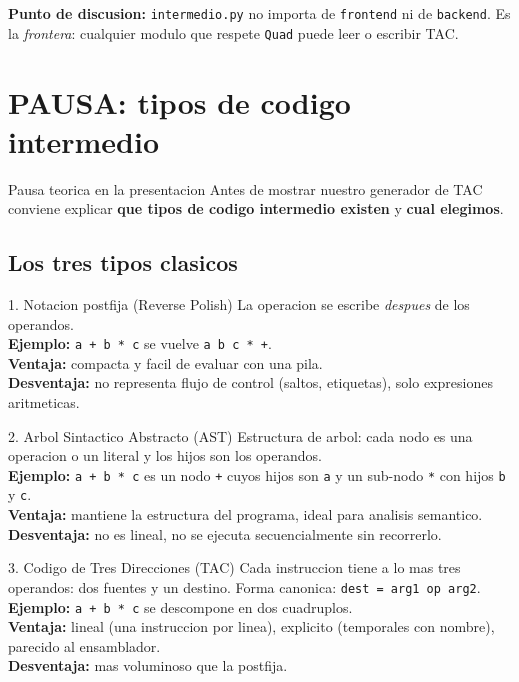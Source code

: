 \documentclass[11pt,a4paper]{article}
\begin{document}
\textbf{Punto de discusion:} \texttt{intermedio.py} no importa de
\texttt{frontend} ni de \texttt{backend}. Es la \emph{frontera}: cualquier
modulo que respete \texttt{Quad} puede leer o escribir TAC.

\section{PAUSA: tipos de codigo intermedio}

\begin{pausa}{Pausa teorica en la presentacion}
Antes de mostrar nuestro generador de TAC conviene explicar \textbf{que
tipos de codigo intermedio existen} y \textbf{cual elegimos}.
\end{pausa}

\subsection{Los tres tipos clasicos}

\begin{concepto}{1. Notacion postfija (Reverse Polish)}
La operacion se escribe \emph{despues} de los operandos. \\
\textbf{Ejemplo:} \texttt{a + b * c} se vuelve \texttt{a b c * +}. \\
\textbf{Ventaja:} compacta y facil de evaluar con una pila. \\
\textbf{Desventaja:} no representa flujo de control (saltos, etiquetas),
solo expresiones aritmeticas.
\end{concepto}

\begin{concepto}{2. Arbol Sintactico Abstracto (AST)}
Estructura de arbol: cada nodo es una operacion o un literal y los hijos
son los operandos. \\
\textbf{Ejemplo:} \texttt{a + b * c} es un nodo \texttt{+} cuyos hijos
son \texttt{a} y un sub-nodo \texttt{*} con hijos \texttt{b} y \texttt{c}. \\
\textbf{Ventaja:} mantiene la estructura del programa, ideal para
analisis semantico. \\
\textbf{Desventaja:} no es lineal, no se ejecuta secuencialmente sin
recorrerlo.
\end{concepto}

\begin{concepto}{3. Codigo de Tres Direcciones (TAC)}
Cada instruccion tiene a lo mas tres operandos: dos fuentes y un destino.
Forma canonica: \texttt{dest = arg1 op arg2}. \\
\textbf{Ejemplo:} \texttt{a + b * c} se descompone en dos cuadruplos. \\
\textbf{Ventaja:} lineal (una instruccion por linea), explicito
(temporales con nombre), parecido al ensamblador. \\
\textbf{Desventaja:} mas voluminoso que la postfija.
\end{concepto}
\end{document}

